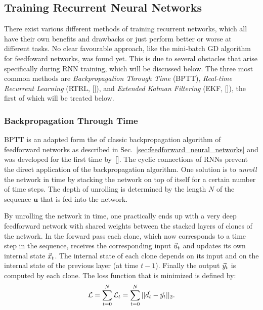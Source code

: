 \subsection{Training Recurrent Neural Networks}
\label{sub:training_recurrent_neural_networks}

There exist various different methods of training recurrent networks, which all
have their own benefits and drawbacks or just perform better or worse at
different tasks. No clear favourable approach, like the mini-batch GD algorithm
for feedfoward networks, was found yet.  This is due to several obstacles that
arise specifically during RNN training, which will be discussed below.  The
three most common methods are \emph{Backpropagation Through Time} (BPTT),
\emph{Real-time Recurrent Learning} (RTRL, [\cite{williams1989}]), and
\emph{Extended Kalman Filtering} (EKF, [\cite{williams1992}]), the first of which
will be treated below.

\subsubsection{Backpropagation Through Time}
\label{ssub:backpropagation_through_time}

BPTT is an adapted form the of classic backpropagation algorithm of feedforward
networks as described in Sec.~\ref{sec:feedforward_neural_networks} and was
developed for the first time by~[\cite{mozerBPTT}].  The
cyclic connections of RNNs prevent the direct application of the
backpropagation algorithm.  One solution is to \emph{unroll} the network in
time by stacking the network on top of itself for a certain number of time
steps.  The depth of unrolling is determined by the length $N$ of the sequence
$\mathbf{u}$ that is fed into the network.

By unrolling the network in time, one practically ends up with a very deep
feedforward network with shared weights between the stacked layers of clones of
the network.  In the forward pass each clone, which now corresponds to a time
step in the sequence, receives the corresponding input $\vec{u}_t$ and updates its
own internal state $\vec{x}_t$.  The internal state of each clone depends on its
input and on the internal state of the previous layer (at time $t-1$).  Finally
the output $\vec{y}_t$ is computed by each clone.  The loss function that is
minimized is defined by:
\begin{equation}
  \mathcal{L} = \sum_{t=0}^{N} \mathcal{L}_t
              = \sum_{t=0}^{N} || \vec{d}_t - \vec{y}_t ||_2.
\end{equation}

